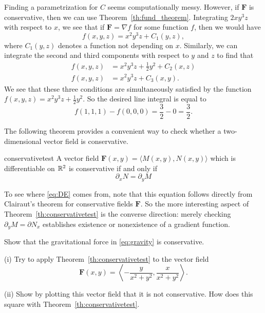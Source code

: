 \documentclass[svgnames]{watsonbook}
\begin{document}
\begin{solution}
  Finding a parametrization for $C$ seems computationally messy.
  However, if $\mathbf{F}$ is conservative, then we can use
  Theorem~\ref{th:fund_theorem}. Integrating $2  x y^{3} z$ with
  respect to $x$, we see that if $\mathbf{F} = \nabla f$ for some
  function $f$, then we would have 
  \[
    f(x,y,z) = x^2 y^3 z + C_1(y,z), 
  \]
  where $C_1(y,z)$ denotes a function not depending on $x$. Similarly,
  we can integrate the second and third components with respect to $y$
  and $z$ to find that
  \begin{align*}
    f(x,y,z) &= x^2 y^3 z + \frac{1}{2}y^2 + C_2(x,z) \\
    f(x,y,z) &= x^2 y^3 z + C_3(x,y). 
  \end{align*}
  We see that these three conditions are simultaneously satisfied by
  the function $f(x,y,z) = x^2 y^3 z + \tfrac{1}{2}y^2$. So the
  desired line integral is equal to 
  \[
    f(1,1,1) - f(0,0,0) = \frac{3}{2} - 0  = \boxed{\frac{3}{2}}. 
  \]
\end{solution}

The following theorem provides a convenient way to check whether a
two-dimensional vector field is conservative. 

\begin{theo}{}{conservativetest}
  A vector field $\mathbf{F}(x,y) = \langle M(x,y), N(x,y)\rangle$
  which is differentiable on $\mathbb{R}^2$ is
  conservative if and only if
  \begin{equation} \label{eq:DE}
    \partial_x N = \partial_y M
  \end{equation}
\end{theo}
To see where \eqref{eq:DE} comes from, note that this equation follows directly
from Clairaut's theorem for conservative fields $\mathbf{F}$. 
So the more interesting aspect of Theorem~\ref{th:conservativetest} is
the converse direction: merely checking $\partial_y M = \partial N_x$
establishes existence or nonexistence of a gradient function. 

\begin{exercise}{}{}
  Show that the gravitational force in \eqref{eq:gravity} is
  conservative.
\end{exercise}

\begin{exercise}{}{}
  (i) Try to apply Theorem~\ref{th:conservativetest}  to the vector
  field
  \[
    \mathbf{F}(x,y) = \left\langle
      -\frac{y}{{x^2+y^2}},
      \frac{x}{{x^2+y^2}}
    \right\rangle. 
  \]
  
  (ii) Show by plotting this vector field that it is not
  conservative. How does this square with Theorem~\ref{th:conservativetest}. 
\end{exercise}
\end{document}
